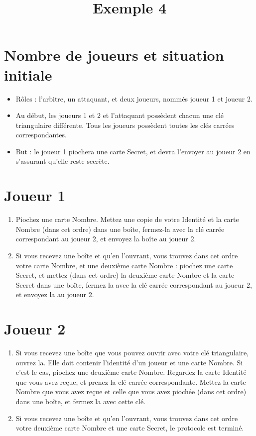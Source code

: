 \documentclass[a4paper,10pt]{article}
\title{Exemple 4}
\begin{document}
\maketitle

\section{Nombre de joueurs et situation initiale}
\begin{itemize}
	\item Rôles : l'arbitre, un attaquant, et deux joueurs, nommés joueur 1 et joueur 2.
	\item Au début, les joueurs 1 et 2 et l'attaquant possèdent chacun une clé triangulaire différente. Tous les joueurs possèdent toutes les clés carrées correspondantes.
	\item But : le joueur 1 piochera une carte Secret, et devra l'envoyer au joueur 2 en s'assurant qu'elle reste secrète.
\end{itemize}




\section{Joueur 1}
\begin{enumerate}
	\item Piochez une carte Nombre. Mettez une copie de votre Identité et la carte Nombre (dans cet ordre) dans une boîte, fermez-la avec la clé carrée correspondant au joueur 2, et envoyez la boîte au joueur 2.
	\item Si vous recevez une boîte et qu'en l'ouvrant, vous trouvez dans cet ordre votre carte Nombre, et une deuxième carte Nombre : piochez une carte Secret, et mettez (dans cet ordre) la deuxième carte Nombre et la carte Secret dans une boîte, fermez la avec la clé carrée correspondant au joueur 2, et envoyez la au joueur 2.
\end{enumerate}

\section{Joueur 2}
\begin{enumerate}
	\item Si vous recevez une boîte que vous pouvez ouvrir avec votre clé triangulaire, ouvrez la. Elle doit contenir l'identité d'un joueur et une carte Nombre. Si c'est le cas, piochez une deuxième carte Nombre. Regardez la carte Identité que vous avez reçue, et prenez la clé carrée correspondante. Mettez la carte Nombre que vous avez reçue et celle que vous avez piochée (dans cet ordre) dans une boîte, et fermez la avec cette clé.
	\item Si vous recevez une boîte et qu'en l'ouvrant, vous trouvez dans cet ordre votre deuxième carte Nombre et une carte Secret, le protocole est terminé.
\end{enumerate}
\end{document}
